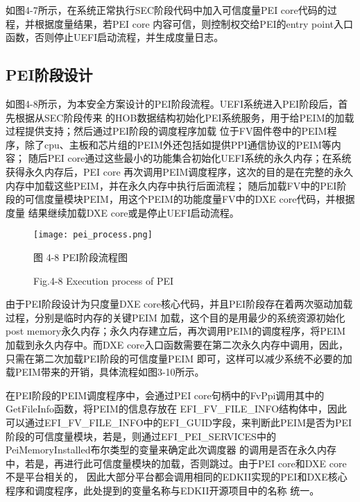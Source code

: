 如图4-7所示，在系统正常执行SEC阶段代码中加入可信度量PEI core代码的过程，并根据度量结果，若PEI core
内容可信，则控制权交给PEI的entry point入口函数，否则停止UEFI启动流程，并生成度量日志。

\subsection{PEI阶段设计}

如图4-8所示，为本安全方案设计的PEI阶段流程。UEFI系统进入PEI阶段后，首先根据从SEC阶段传来
的HOB数据结构初始化PEI系统服务，用于给PEIM的加载过程提供支持；然后通过PEI阶段的调度程序加载
位于FV固件卷中的PEIM程序，除了cpu、主板和芯片组的PEIM外还包括如提供PPI通信协议的PEIM等内容；
随后PEI core通过这些最小的功能集合初始化UEFI系统的永久内存；在系统获得永久内存后，PEI core
再次调用PEIM调度程序，这次的目的是在完整的永久内存中加载这些PEIM，并在永久内存中执行后面流程；
随后加载FV中的PEI阶段的可信度量模块PEIM，用这个PEIM的功能度量FV中的DXE core代码，并根据度量
结果继续加载DXE core或是停止UEFI启动流程。

\begin{figure}[htb]
    \vspace{0cm}   
    \setlength{\abovecaptionskip}{0.3cm}
	\centering
    \texttt{[image: pei\_process.png]}
    \caption*{图 4-8 PEI阶段流程图}
    \setlength{\belowcaptionskip}{-0.5cm}
    \caption*{Fig.4-8 Execution process of PEI}
\end{figure}

\par 由于PEI阶段设计为只度量DXE core核心代码，并且PEI阶段存在着两次驱动加载过程，分别是临时内存的关键PEIM
加载，这个目的是用最少的系统资源初始化post memory永久内存；永久内存建立后，再次调用PEIM的调度程序，将PEIM
加载到永久内存中。而DXE core入口函数需要在第二次永久内存中调用，因此，只需在第二次加载PEI阶段的可信度量PEIM
即可，这样可以减少系统不必要的加载PEIM带来的开销，具体流程如图3-10所示。
\par 在PEI阶段的PEIM调度程序中，会通过PEI core句柄中的FvPpi调用其中的GetFileInfo函数，将PEIM的信息存放在
EFI\_FV\_FILE\_INFO结构体中，因此可以通过EFI\_FV\_FILE\_INFO中的EFI\_GUID字段，来判断此PEIM是否为PEI
阶段的可信度量模块，若是，则通过EFI\_PEI\_SERVICES中的PeiMemoryInstalled布尔类型的变量来确定此次调度器
的调用是否在永久内存中，若是，再进行此可信度量模块的加载，否则跳过。由于PEI core和DXE core不是平台相关的，
因此大部分平台都会调用相同的EDKII实现的PEI和DXE核心程序和调度程序，此处提到的变量名称与EDKII开源项目中的名称
统一。

